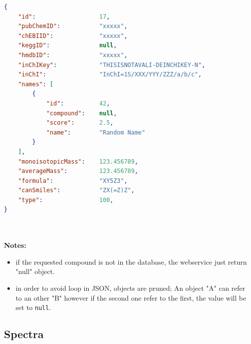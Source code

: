 	\begin{lstlisting}[language=json,caption={Compound JSON structure},label=compoundResult]
{
	"id":                  17,
	"pubChemID":           "xxxxx",
	"chEBIID":             "xxxxx",
	"keggID":              null,
	"hmdbID":              "xxxxx",
	"inChIKey":            "THISISNOTAVALI-DEINCHIKEY-N",
	"inChI":               "InChI=1S/XXX/YYY/ZZZ/a/b/c",
	"names": [
		{
			"id":          42,
			"compound":    null,
			"score":       2.5,
			"name":        "Random Name"
		}
	],
	"monoisotopicMass":    123.456789,
	"averageMass":         123.456789,
	"formula":             "XY5Z3",
	"canSmiles":           "ZX(=Z)Z",
	"type":                100,
}
	\end{lstlisting}
% 
~\\
~\\
\textbf{Notes:}
\begin{itemize}
	\item if the requested compound is not in the database, the webservice just return "null" object. 
	\item in order to avoid loop in JSON, objects are pruned; An object "A" can refer to an other "B" however if the second one refer to the first, the value will be set to \texttt{null}.
\end{itemize}

\subsection{Spectra}

